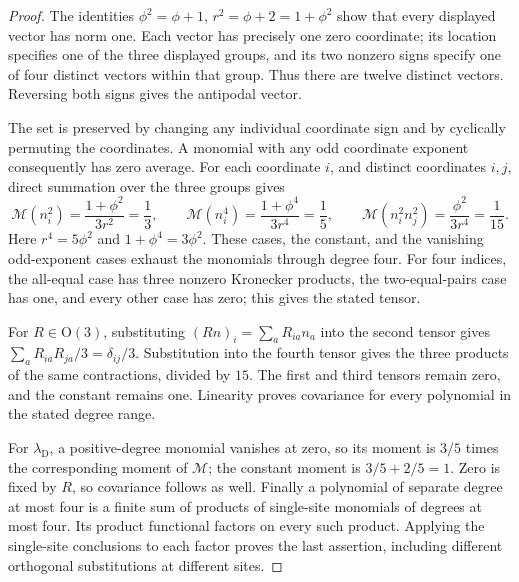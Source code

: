 \begin{proof}
The identities \(\phi^2=\phi+1\), \(r^2=\phi+2=1+\phi^2\) show that
every displayed vector has norm one. Each vector has precisely one zero
coordinate; its location specifies one of the three displayed groups,
and its two nonzero signs specify one of four distinct vectors within
that group. Thus there are twelve distinct vectors. Reversing both signs
gives the antipodal vector.

The set is preserved by changing any individual coordinate sign and by
cyclically permuting the coordinates. A monomial with any odd coordinate
exponent consequently has zero average. For each coordinate \(i\), and
distinct coordinates \(i,j\), direct summation over the three groups gives
\[
 \mathcal M(n_i^2)=\frac{1+\phi^2}{3r^2}=\frac13,\qquad
 \mathcal M(n_i^4)=\frac{1+\phi^4}{3r^4}=\frac15,\qquad
 \mathcal M(n_i^2n_j^2)=\frac{\phi^2}{3r^4}=\frac1{15}.
\]
Here \(r^4=5\phi^2\) and \(1+\phi^4=3\phi^2\).
These cases, the constant, and the vanishing odd-exponent cases exhaust
the monomials through degree four. For four indices, the all-equal case
has three nonzero Kronecker products, the two-equal-pairs case has one,
and every other case has zero; this gives the stated tensor.

For \(R\in\mathrm O(3)\), substituting
\((Rn)_i=\sum_aR_{ia}n_a\) into the second tensor gives
\(\sum_aR_{ia}R_{ja}/3=\delta_{ij}/3\).
Substitution into the fourth tensor gives the three products of the
same contractions, divided by \(15\). The first and third tensors
remain zero, and the constant remains one. Linearity proves covariance
for every polynomial in the stated degree range.

For \(\lambda_{\mathrm D}\), a positive-degree monomial vanishes at
zero, so its moment is \(3/5\) times the corresponding moment of
\(\mathcal M\); the constant moment is \(3/5+2/5=1\).
Zero is fixed by \(R\), so covariance follows as well.
Finally a polynomial of separate degree at most four is a finite sum
of products of single-site monomials of degrees at most four.
Its product functional factors on every such product. Applying the
single-site conclusions to each factor proves the last assertion,
including different orthogonal substitutions at different sites.
\end{proof}

